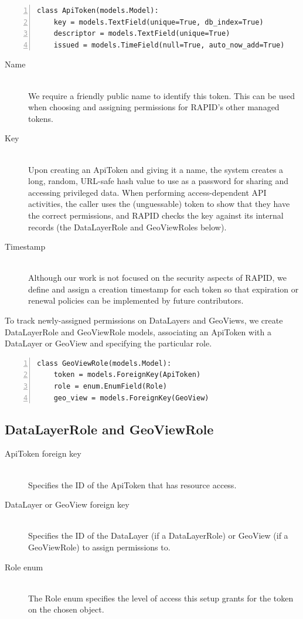 \begin{Verbatim}[samepage=true,baselinestretch=1,numbers=left,xleftmargin=12mm]
class ApiToken(models.Model):
    key = models.TextField(unique=True, db_index=True)
    descriptor = models.TextField(unique=True)
    issued = models.TimeField(null=True, auto_now_add=True)
\end{Verbatim}

\begin{description}
\item[Name] \hfill \\
We require a friendly public name to identify this token. This can be used when choosing and assigning permissions for RAPID's other managed tokens.

\item[Key] \hfill \\
Upon creating an ApiToken and giving it a name, the system creates a long, random, URL-safe hash value to use as a password for sharing and accessing privileged data. When performing access-dependent API activities, the caller uses the (unguessable) token to show that they have the correct permissions, and RAPID checks the key against its internal records (the DataLayerRole and GeoViewRoles below).

\item[Timestamp] \hfill \\
Although our work is not focused on the security aspects of RAPID, we define and assign a creation timestamp for each token so that expiration or renewal policies can be implemented by future contributors.

\end{description}
To track newly-assigned permissions on DataLayers and GeoViews, we create DataLayerRole and GeoViewRole models, associating an ApiToken with a DataLayer or GeoView and specifying the particular role.


\begin{Verbatim}[samepage=true,baselinestretch=1,numbers=left,xleftmargin=12mm]
class GeoViewRole(models.Model):
    token = models.ForeignKey(ApiToken)
    role = enum.EnumField(Role)
    geo_view = models.ForeignKey(GeoView)
\end{Verbatim}

\subsection{DataLayerRole and GeoViewRole}
\begin{description}
\item[ApiToken foreign key] \hfill \\
Specifies the ID of the ApiToken that has resource access.

\item[DataLayer or GeoView foreign key] \hfill \\
Specifies the ID of the DataLayer (if a DataLayerRole) or GeoView (if a GeoViewRole) to assign permissions to.

\item[Role enum] \hfill \\
The Role enum specifies the level of access this setup grants for the token on the chosen object.
\end{description}

